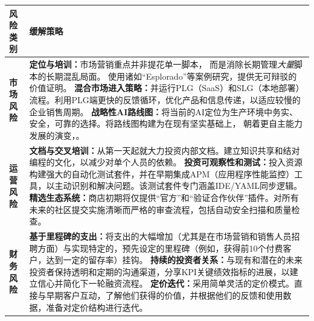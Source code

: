 \documentclass[11点, A4纸, 单面]{article}
\begin{document}
\begin{table}[H]
\centering
\begin{tabularx}{\textwidth}{@{}lL@{}}
\toprule
\textbf{风险类别} & \textbf{缓解策略} \\
\midrule
\textbf{市场风险} & 
\textbf{定位与培训：}市场营销重点并非提花单一脚本， 而是消除长期管理\textit{大量}脚本的长期混乱局面。 使用诸如“Esplorado”等案例研究，提供无可辩驳的价值证明。 \newline\newline
\textbf{混合市场进入策略：}并运行PLG（SaaS）和SLG（本地部署）流程。利用PLG端更快的反馈循环，优化产品和信息传递，以适应较慢的企业销售周期。 \newline\newline
\textbf{战略性AI路线图：}将当前的AI定位为生产环境中务实、安全，可靠的选择。将路线图构建为在现有坚实基础上， 朝着更自主能力发展的演变，。 \\
\addlinespace
\textbf{运营风险} & 
\textbf{文档与交叉培训：}从第一天起就大力投资内部文档。建立知识共享和结对编程的文化，以减少对单个人员的依赖。 \newline\newline
\textbf{投资可观察性和测试：}投入资源构建强大的自动化测试套件，并在早期集成APM（应用程序性能监控）工具，以主动识别和解决问题。该测试套件专门涵盖IDE/YAML同步逻辑。 \newline\newline
\textbf{精选生态系统：}商店初期将仅提供“官方”和“验证合作伙伴”插件。对所有未来的社区提交实施清晰而严格的审查流程，包括自动安全扫描和质量检查。 \\
\addlinespace
\textbf{财务风险} & 
\textbf{基于里程碑的支出：}将支出的大幅增加（尤其是在市场营销和销售人员招聘方面）与实现特定的，预先设定的里程碑（例如，获得前10个付费客户，达到一定的留存率）挂钩。 \newline\newline
\textbf{持续的投资者关系：}与现有和潜在的未来投资者保持透明和定期的沟通渠道，分享KPI关键绩效指标的进展，以建立信心并简化下一轮融资流程。 \newline\newline
\textbf{定价迭代：}采用简单灵活的定价模式。直接与早期客户互动，了解他们获得的价值，并根据他们的反馈和使用数据，准备对定价结构进行迭代。 \\
\bottomrule
\end{tabularx}
\end{table}

\newpage
\end{document}

